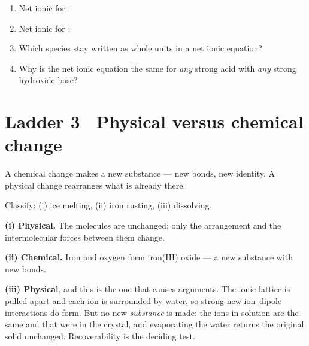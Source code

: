 \documentclass{apchem-worksheet}
\begin{document}
\begin{yourturn}
\begin{enumerate}[leftmargin=*,itemsep=0.5em]
  \item Net ionic for :
        \workspace[1.6cm]
  \item Net ionic for :
        \workspace[1.6cm]
  \item Which species stay written as whole units in a net ionic equation?
        \workspace[1.6cm]
  \item Why is the net ionic equation the same for \emph{any} strong acid
        with \emph{any} strong hydroxide base? \workspace[1.8cm]
\end{enumerate}
\end{yourturn}

\section*{\sffamily Ladder 3 \textbullet\ Physical versus chemical change}

A chemical change makes a new substance --- new bonds, new identity. A
physical change rearranges what is already there.

\begin{workedexample}
Classify: (i) ice melting, (ii) iron rusting, (iii)  dissolving.

\textbf{(i) Physical.} The  molecules are unchanged; only the
arrangement and the intermolecular forces between them change.

\textbf{(ii) Chemical.} Iron and oxygen form iron(III) oxide --- a new
substance with new bonds.

\textbf{(iii) Physical}, and this is the one that causes arguments. The
ionic lattice is pulled apart and each ion is surrounded by water, so
strong new ion--dipole interactions do form. But no new \emph{substance}
is made: the ions in solution are the same  and  that were
in the crystal, and evaporating the water returns the original solid
unchanged. Recoverability is the deciding test.
\end{workedexample}
\end{document}
